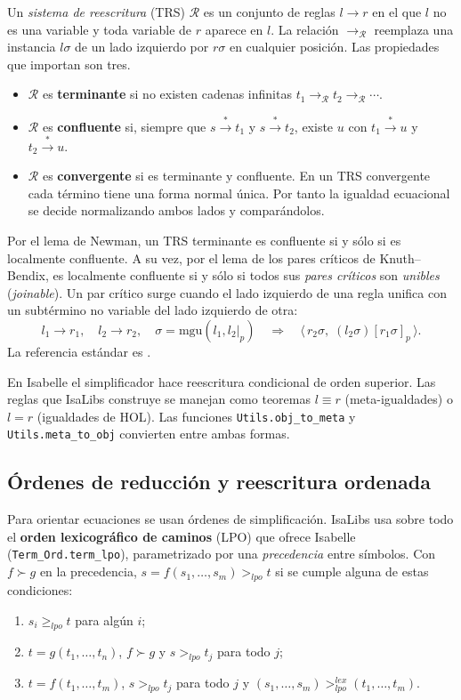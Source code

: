 \documentclass[11pt,a4paper]{article}
\newcommand{\isa}[1]{\texttt{#1}}
\newcommand{\R}{\mathcal{R}}
\newcommand{\rw}{\rightarrow}
\newcommand{\rws}{\stackrel{*}{\rightarrow}}
\newcommand{\lpo}{>_{\mathit{lpo}}}
\theoremstyle{definition}
\theoremstyle{remark}
\begin{document}
Un \emph{sistema de reescritura} (TRS) $\R$ es un conjunto de reglas $l \rw r$ en el
que $l$ no es una variable y toda variable de $r$ aparece en $l$. La relación $\rw_\R$
reemplaza una instancia $l\sigma$ de un lado izquierdo por $r\sigma$ en cualquier
posición. Las propiedades que importan son tres.
\begin{itemize}[nosep]
  \item $\R$ es \textbf{terminante} si no existen cadenas infinitas
        $t_1 \rw_\R t_2 \rw_\R \cdots$.
  \item $\R$ es \textbf{confluente} si, siempre que $s \rws t_1$ y $s \rws t_2$,
        existe $u$ con $t_1 \rws u$ y $t_2 \rws u$.
  \item $\R$ es \textbf{convergente} si es terminante y confluente. En un TRS
        convergente cada término tiene una forma normal única. Por tanto la
        igualdad ecuacional se decide normalizando ambos lados y comparándolos.
\end{itemize}
Por el lema de Newman, un TRS terminante es confluente si y sólo si es localmente
confluente. A su vez, por el lema de los pares críticos de Knuth--Bendix, es
localmente confluente si y sólo si todos sus \emph{pares críticos} son
\emph{unibles} (\emph{joinable}). Un par crítico surge cuando el lado izquierdo de
una regla unifica con un subtérmino no variable del lado izquierdo de otra:
\[
  l_1 \rw r_1,\quad l_2 \rw r_2,\quad \sigma = \mathrm{mgu}(l_1, l_2|_p)
  \quad\Longrightarrow\quad \langle\, r_2\sigma,\; (l_2\sigma)[r_1\sigma]_p \,\rangle .
\]
La referencia estándar es \cite{baader-nipkow}.

En Isabelle el simplificador hace reescritura condicional de orden superior. Las
reglas que IsaLibs construye se manejan como teoremas $l \equiv r$ (meta-igualdades)
o $l = r$ (igualdades de HOL). Las funciones \isa{Utils.obj\_to\_meta} y
\isa{Utils.meta\_to\_obj} convierten entre ambas formas.

\subsection{Órdenes de reducción y reescritura ordenada}

Para orientar ecuaciones se usan órdenes de simplificación. IsaLibs usa sobre todo
el \textbf{orden lexicográfico de caminos} (LPO) que ofrece Isabelle
(\isa{Term\_Ord.term\_lpo}), parametrizado por una \emph{precedencia} entre
símbolos. Con $f \succ g$ en la precedencia, $s = f(s_1,\ldots,s_m) \lpo t$ si se
cumple alguna de estas condiciones:
\begin{enumerate}[nosep]
  \item $s_i \geq_{\mathit{lpo}} t$ para algún $i$;
  \item $t = g(t_1,\ldots,t_n)$, $f \succ g$ y $s \lpo t_j$ para todo $j$;
  \item $t = f(t_1,\ldots,t_m)$, $s \lpo t_j$ para todo $j$ y
        $(s_1,\ldots,s_m) \lpo^{\mathit{lex}} (t_1,\ldots,t_m)$.
\end{enumerate}
\end{document}

